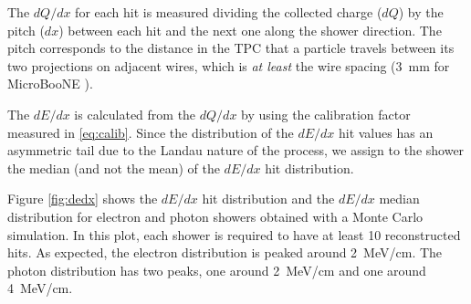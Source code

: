 The $dQ/dx$ for each hit is measured dividing the collected charge ($dQ$) by the pitch ($dx$) between each hit and the next one along the shower direction. The pitch corresponds to the distance in the TPC that a particle travels between its two projections  on adjacent wires, which is \emph{at least} the wire spacing (3~mm for MicroBooNE \cite{detector}). 

The $dE/dx$ is calculated from the $dQ/dx$ by using the calibration factor measured in \eqref{eq:calib}.
Since the distribution of the $dE/dx$ hit values has an asymmetric tail due to the Landau nature of the process, we assign to the shower the median (and not the mean) of the $dE/dx$ hit distribution.

Figure \ref{fig:dedx} shows the $dE/dx$ hit distribution and the $dE/dx$ median distribution for electron and photon showers obtained with a Monte Carlo simulation. In this plot, each shower is required to have at least 10 reconstructed hits. As expected, the electron distribution is peaked around 2~MeV/cm. The photon distribution has two peaks, one around 2~MeV/cm and one around 4~MeV/cm. 


